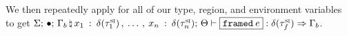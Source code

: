 \begin{preservation}
{    We then repeatedly apply  for all of our type,
    region, and environment variables to get
    $\oxtypjudge{\oxglobalctx}{\oxemptyctx}{\oxkontctx}{
      \oxnewframe{\oxvarctx_b}{
        \oxvarctxentry{\oxid_1}{\delta(\oxsitype_1)} \oxdotsc
        \oxvarctxentry{\oxid_n}{\delta(\oxsitype_n)}
      }
    }{
      \oxframed{\oxexpr}
    }{\delta(\oxsitype_f)}{\oxvarctx_b}$.
  }


\end{preservation}



